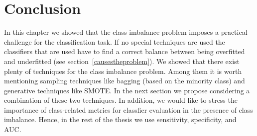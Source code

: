 \section{Conclusion}\label{imb-summary}
In this chapter we showed that the class imbalance problem imposes a practical challenge for the classification task. If no special techniques are used  the classifiers that are used have to find a correct balance between being overfitted and underfitted (see section~\ref{causestheproblem}). We showed that there exist plenty of techniques for the class imbalance problem. Among them it is worth mentioning sampling techniques like bagging (based on the minority class) and generative techniques like SMOTE. In the next section we propose considering a combination of these two techniques. In addition, we would like to stress the importance of class-related metrics for classfier evaluation in the presence of  class imbalance. Hence, in the rest of the thesis we use sensitivity, specificity, and AUC.


